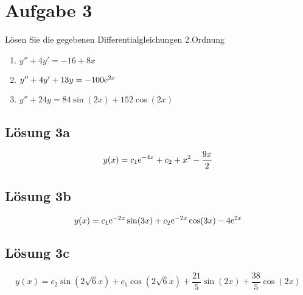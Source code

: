 \documentclass[main.tex]{subfiles}
\begin{document}
\section{Aufgabe 3}
Lösen Sie die gegebenen Differentialgleichungen 2.Ordnung
\begin{enumerate}
    \item $y'' + 4y' = -16 + 8x$
    \item $y'' + 4y' + 13y = -100\mathrm{e}^{2x}$
    \item $y'' + 24y = 84\sin(2x) + 152\cos(2x)$
\end{enumerate}

\subsection{Lösung 3a}

$$
    y(x) = c_1 \mathrm{e}^{-4 x} + c_2 + x^2 - \frac{9 x}{2}
$$

\subsection{Lösung 3b}
$$
    y(x) = c_1 \mathrm{e}^{-2 x} \sin(3 x) + c_2 \mathrm{e}^{-2 x} \cos(3 x) - 4 \mathrm{e}^{2 x}
$$

\subsection{Lösung 3c}

$$
    y(x) = c_2 \sin(2 \sqrt{6} x) + c_1 \cos(2 \sqrt{6} x) + \frac{21}{5} \sin(2 x) + \frac{38}{5} \cos(2 x)
$$
\end{document}
